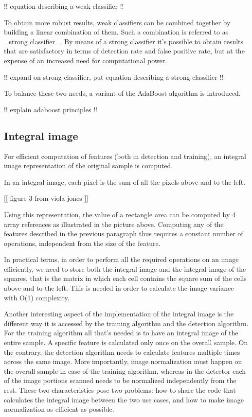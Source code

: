 \documentclass[a4paper,12pt,titlepage]{article}
\begin{document}
!! equation describing a weak classifier !!

To obtain more robust results, weak classifiers can be combined together by
building a linear combination of them. Such a combination is referred to as
_strong classifier_. By means of a strong classifier it's possible to obtain
results that are satisfactory in terms of detection rate and false positive
rate, but at the expense of an increased need for computational power.

!! expand on strong classifier, put equation describing a strong classifier !!

To balance these two needs, a variant of the AdaBoost algorithm is introduced.

!! explain adaboost principles !!

\subsection{Integral image}
For efficient computation of features (both in detection and training), an
integral image representation of the original sample is computed.

In an integral image, each pixel is the sum of all the pixels above and to the
left.

[[ figure 3 from viola jones ]]

Using this representation, the value of a rectangle area can be computed by 4
array references as illustrated in the picture above. Computing any of the
features described in the previous paragraph thus requires a constant number of
operations, independent from the size of the feature.

In practical terms, in order to perform all the required operations on an image
efficiently, we need to store both the integral image and the integral image of
the squares, that is the matrix in which each cell contains the square sum of
the cells above and to the left. This is needed in order to calculate the image
variance with O(1) complexity.

Another interesting aspect of the implementation of the integral image is the
different way it is accessed by the training algorithm and the detection
algorithm. For the training algorithm all that's needed is to have an integral
image of the entire sample. A specific feature is calculated only once on the
overall sample. On the contrary, the detection algorithm needs to calculate
features multiple times across the same image. More importantly, image
normalization must happen on the overall sample in case of the training
algorithm, whereas in the detector each of the image portions scanned needs to
be normalized independently from the rest.
These two characteristics pose two problems: how to share the code that
calculates the integral image between the two use cases, and how to make image
normalization as efficient as possible.
\end{document}
